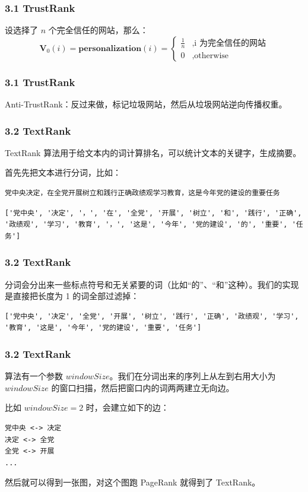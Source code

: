 \documentclass{beamer}
\begin{document}
\begin{frame}
	\frametitle{3.1 TrustRank}
	设选择了 \(n\) 个完全信任的网站，那么：
	\[
	\mathbf{V}_0(i) = \mathbf{personalization}(i) =
	\begin{cases}
		\frac{1}{n} &,\text{i 为完全信任的网站} \\
		0 &,\text{otherwise}
	\end{cases}
	\]
\end{frame}

\begin{frame}
	\frametitle{3.1 TrustRank}
	Anti-TrustRank：反过来做，标记垃圾网站，然后从垃圾网站逆向传播权重。
\end{frame}

\begin{frame}[fragile]
	\frametitle{3.2 TextRank}
	TextRank 算法用于给文本内的词计算排名，可以统计文本的关键字，生成摘要。

	\pause

	首先先把文本进行分词，比如：

	\pause

\begin{lstlisting}
党中央决定，在全党开展树立和践行正确政绩观学习教育，这是今年党的建设的重要任务
\end{lstlisting}

	\pause

\begin{lstlisting}
['党中央', '决定', '，', '在', '全党', '开展', '树立', '和', '践行', '正确', '政绩观', '学习', '教育', '，', '这是', '今年', '党的建设', '的', '重要', '任务']
\end{lstlisting}
\end{frame}

\begin{frame}[fragile]
	\frametitle{3.2 TextRank}
	分词会分出来一些标点符号和无关紧要的词（比如“的”、“和”这种）。我们的实现是直接把长度为 1 的词全部过滤掉：

	\pause

\begin{lstlisting}
['党中央', '决定', '全党', '开展', '树立', '践行', '正确', '政绩观', '学习', '教育', '这是', '今年', '党的建设', '重要', '任务']
\end{lstlisting}
\end{frame}

\begin{frame}[fragile]
	\frametitle{3.2 TextRank}
	算法有一个参数 \(windowSize\)。我们在分词出来的序列上从左到右用大小为 \(windowSize\) 的窗口扫描，然后把窗口内的词两两建立无向边。
	
	\pause

	比如 \(windowSize = 2\) 时，会建立如下的边：

\begin{lstlisting}
党中央 <-> 决定
决定 <-> 全党
全党 <-> 开展
...
\end{lstlisting}

	\pause

	然后就可以得到一张图，对这个图跑 PageRank 就得到了 TextRank。
\end{frame}
\end{document}
